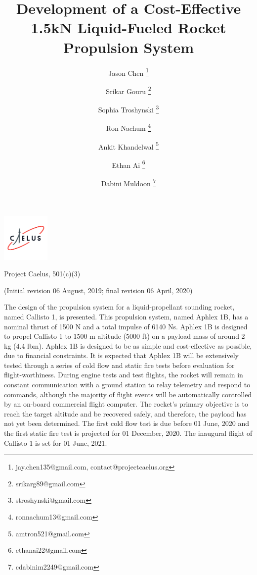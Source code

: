 \documentclass[9pt]{article} %
\title{Development of a Cost-Effective 1.5kN Liquid-Fueled Rocket Propulsion System}
\author[1]{Jason Chen \footnote{jay.chen135@gmail.com, contact@projectcaelus.org}}
\affil[1]{Project Lead and Chief Engineer}
\author[2]{Srikar Gouru \footnote{srikarg89@gmail.com}}
\affil[2]{Flight and Ground Software Lead}
\author[3]{Sophia Troshynski \footnote{stroshynski@gmail.com}}
\affil[3]{Manufacturing Lead}
\author[4]{Ron Nachum \footnote{ronnachum13@gmail.com}}
\affil[4]{Propulsion Lead}
\author[5]{Ankit Khandelwal \footnote{amtron521@gmail.com}}
\affil[5]{Avionics Lead}
\author[6]{Ethan Ai \footnote{ethanai22@gmail.com}}
\affil[6]{CAD and Testing Lead}
\author[7]{Dabini Muldoon \footnote{cdabinim2249@gmail.com}}
\affil[7]{Structures and Ground Operations Lead}
\date{} %
\numberwithin{equation}{section} %
\begin{document}
\maketitle
\vspace{-1cm}
\begin{center}
\centering
\includegraphics[scale=0.5, width=0.175\textwidth]{caelus_logo}

Project Caelus, 501(c)(3)

(Initial revision 06 August, 2019; final revision 06 April, 2020)
\end{center}

\begin{adjustwidth}{30pt}{30pt}
\hspace{\parindent} The design of the propulsion system for a liquid-propellant sounding rocket, named Callisto 1, is presented. This propulsion system, named Aphlex 1B, has a nominal thrust of 1500 N and a total impulse of 6140 Ns. Aphlex 1B is designed to propel Callisto 1 to 1500 m altitude (5000 ft) on a payload mass of around 2 kg (4.4 lbm). Aphlex 1B is designed to be as simple and cost-effective as possible, due to financial constraints. It is expected that Aphlex 1B will be extensively tested through a series of cold flow and static fire tests before evaluation for flight-worthiness. During engine tests and test flights, the rocket will remain in constant communication with a ground station to relay telemetry and respond to commands, although the majority of flight events will be automatically controlled by an on-board commercial flight computer. The rocket's primary objective is to reach the target altitude and be recovered safely, and therefore, the payload has not yet been determined. The first cold flow test is due before 01 June, 2020 and the first static fire test is projected for 01 December, 2020. The inaugural flight of Callisto 1 is set for 01 June, 2021.

\end{adjustwidth}
\vspace{0.4cm}
\end{document}
